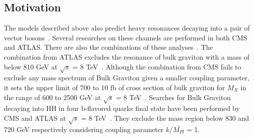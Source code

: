 \subsection{Motivation} 
The models described above also predict heavy resonances decaying into a pair of vector bosons~\citep{Brehmer:2015dan}.
Several researches on these channels are performed in both CMS and ATLAS.
There are also the combinations of these analyses~\citep{Khachatryan:2014hpa,ATLASZV,ATLASWV,ATLASVV}.
The combination from ATLAS excludes the resonance of bulk graviton with a mass of below 810 GeV at $\sqrt{s}$ = 8 TeV~\citep{Aad:2015ipg}. Although the combination from CMS fails to exclude any mass spectrum of Bulk Graviton given a smaller coupling parameter, it sets the upper limit of 700 to 10 fb of cross section of bulk graviton for $M_X$ in the range of 600 to 2500 GeV at $\sqrt{s}$ = 8 TeV~\citep{CMSZVWV}.
Searches for Bulk Graviton decaying into HH in four b-flavored quarks final state have been performed by CMS and ATLAS at $\sqrt{s}$ = 8 TeV~\citep{Khachatryan:2015year,Aad:2015uka}. They exclude the mass region below 830 and 720 GeV respectively considering coupling parameter $k/\bar{M_{Pl}}$ = 1.
 



%
